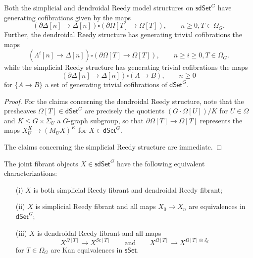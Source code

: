 \documentclass[a4paper,10pt,draft]{article}%
\begin{document}
\begin{proposition}
	Both the simplicial and dendroidal Reedy model structures on 
	$\mathsf{sdSet}^G$ have generating cofibrations given by the maps
\[
	\left(\partial \Delta [n] \to \Delta[n]\right)
		\square
	\left(\partial \Omega[T] \to \Omega[T]\right),
	\qquad
	n\geq 0, T \in \Omega_G.
\]
Further, the dendroidal Reedy structure has generating trivial cofibrations the maps
\begin{equation}\label{DENDTRIVCOF EQ}
	\left(\Lambda^i [n] \to \Delta[n]\right)
		\square
	\left(\partial \Omega[T] \to \Omega[T]\right),
	\qquad
	n\geq i \geq 0, T \in \Omega_G.
\end{equation}
while the simplicial Reedy structure has generating trivial cofibrations the maps
\begin{equation}\label{SIMPTRIVCOF EQ}
	\left(\partial \Delta [n] \to \Delta[n]\right)
		\square
	\left(A \to B\right),
	\qquad
	n\geq 0
\end{equation}
for $\{A \to B\}$ a set of generating trivial cofibrations of
$\mathsf{dSet}^G$.
\end{proposition}

\begin{proof}
	For the claims concerning the dendroidal Reedy structure, 
	note that the presheaves $\Omega[T] \in \mathsf{dSet}^G$
	are precisely the quotients $(G \cdot \Omega[U])/K$ for $U\in \Omega$ and $K \leq G \times \Sigma_U$ a $G$-graph subgroup,
	so that $\partial \Omega[T] \to \Omega[T]$
	represents the maps $X_U^K \to (M_U X)^K$ for $X \in \mathsf{dSet}^G$.
	
	The claims concerning the simplicial Reedy structure are immediate.
\end{proof}


\begin{corollary}\label{JOINTFIBCHAR COR}
The joint fibrant objects $X \in \mathsf{sdSet}^G$ have the following equivalent characterizations:
\begin{itemize}
	\item[(i)] $X$ is both simplicial Reedy fibrant and dendroidal Reedy fibrant;
	\item[(ii)] $X$ is simplicial Reedy fibrant and all maps 
	$X_0 \to X_n$ are equivalences in $\mathsf{dSet}^{G}$;
	\item[(iii)] $X$ is dendroidal Reedy fibrant and all maps
\[
	X^{\Omega[T]} \to X^{Sc[T]}
\qquad \text{and} \qquad
	X^{\Omega[T]} \to X^{\Omega[T]\otimes J_d}
\]
for $T \in \Omega_G$ are Kan equivalences in $\mathsf{sSet}$.
\end{itemize}
\end{corollary}
\end{document}
